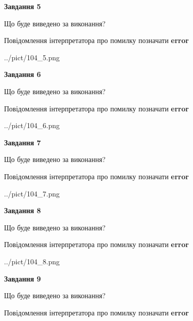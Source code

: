 \documentclass[11pt, ukrainian]{article}
\begin{document}
{\begin {large}
{\begin {center}\textbf{Завдання 5}\end {center}}\par
Що буде виведено за виконання? \par
Повідомлення інтерпретатора про помилку позначати \textbf{error}

\begin{center}
	{../pict/104_5.png}
\end{center}
\newpage

{\begin {center}\textbf{Завдання 6}\end {center}}\par
Що буде виведено за виконання? \par
Повідомлення інтерпретатора про помилку позначати \textbf{error}

\begin{center}
	{../pict/104_6.png}
\end{center}
\newpage

{\begin {center}\textbf{Завдання 7}\end {center}}\par
Що буде виведено за виконання? \par
Повідомлення інтерпретатора про помилку позначати \textbf{error}

\begin{center}
	{../pict/104_7.png}
\end{center}
\newpage

{\begin {center}\textbf{Завдання 8}\end {center}}\par
Що буде виведено за виконання? \par
Повідомлення інтерпретатора про помилку позначати \textbf{error}

\begin{center}
	{../pict/104_8.png}
\end{center}
\newpage

{\begin {center}\textbf{Завдання 9}\end {center}}\par
Що буде виведено за виконання? \par
Повідомлення інтерпретатора про помилку позначати \textbf{error}


\end{large}}
\end{document}
